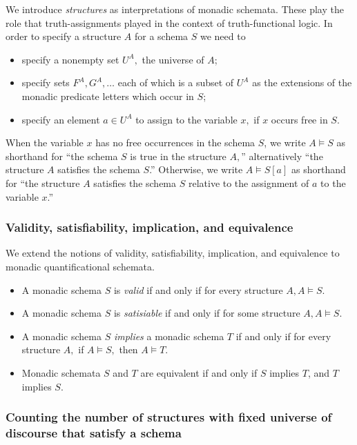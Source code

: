We introduce \emph{structures} as interpretations of monadic schemata. These play the role that truth-assignments played in the context of truth-functional logic.
In order to specify a structure $A$ for a schema $S$ we need to
\begin{itemize}
\item specify a nonempty set $U^A,$ the universe of $A$;
\item specify sets $F^A, G^A, \ldots $ each of which is a subset of $U^A$ as
the extensions of the monadic predicate letters which occur in $S$;
\item specify an element $a \in U^A$ to assign to the variable $x,$ if $x$
occurs free in $S.$ 
\end{itemize}
When the variable $x$ has no free occurrences in the schema $S$, we write $A \models S$ as shorthand for ``the schema $S$ is true in the
structure $A,$'' alternatively ``the structure $A$ satisfies the schema $S$.'' Otherwise, we write $A\models S[a]$ as shorthand for ``the structure $A$ satisfies the schema $S$ relative to the assignment of $a$ to the variable $x$.''  
\subsubsection{Validity, satisfiability, implication, and equivalence}

We extend the notions of validity, satisfiability, implication, and equivalence to monadic quantificational schemata.
\begin{itemize}
\item
A monadic schema $S$ is {\em valid} if and only if for every structure $A, A
\models S.$
\item
A monadic schema $S$ is {\em satisiable} if and only if for some structure $A,
A \models S.$
\item
A monadic schema $S$ {\em implies} a monadic schema $T$ if and only if for
every structure $A,$ if $A \models S,$ then $A \models T.$
\item
Monadic schemata $S$ and $T$ are equivalent if and only if $S$ implies $T$, and $T$ implies $S$. 
\end{itemize}
\subsubsection{Counting the number of structures with fixed universe of discourse that satisfy a schema}

